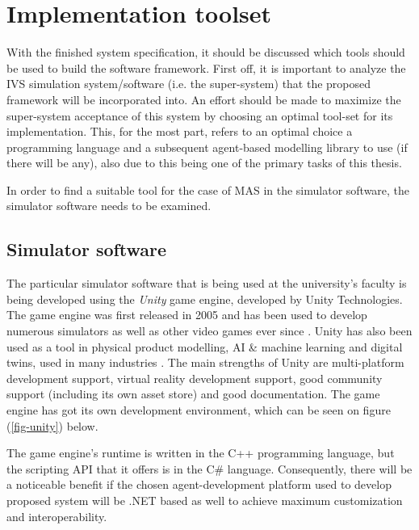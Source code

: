 \documentclass[main.tex]{subfiles}
\begin{document}
\section{Implementation toolset}

With the finished system specification, it should be discussed which tools should be used to build the software framework. 
First off, it is important to analyze the IVS simulation system/software (i.e. the super-system) that
the proposed framework will be incorporated into. An effort should be made to maximize the super-system acceptance of 
this system by choosing an optimal tool-set for its implementation. This, for the most part,
refers to an optimal choice a programming language and a subsequent agent-based modelling
library to use (if there will be any), also due to this being one of the primary tasks of this thesis. 

In order to find a suitable tool for the case of MAS in the simulator software, the simulator software needs to be examined.

\subsection{Simulator software}

The particular simulator software that is being used at the university's faculty is being
developed using the \emph{Unity} game engine, developed by Unity Technologies. The game engine
was first released in 2005 and has been used to develop numerous simulators as well as other
video games ever since \cite{UnityTechnologies2022}.  Unity has also been used as a tool in
physical product modelling, AI \& machine learning and digital twins, used in many industries
\cite{UnityTechnologies2022a}.  The main strengths of Unity are multi-platform development
support, virtual reality development support, good community support (including its own asset
store) and good documentation. The game engine has got its own development environment, which 
can be seen on figure (\ref{fig-unity}) below.

The game engine's runtime is written in the C++ programming language, but the scripting API 
that it offers is in the C\# language. Consequently, there will be a noticeable benefit 
if the chosen agent-development platform used to develop proposed system will be .NET based as well 
to achieve maximum customization and interoperability.
\end{document}
